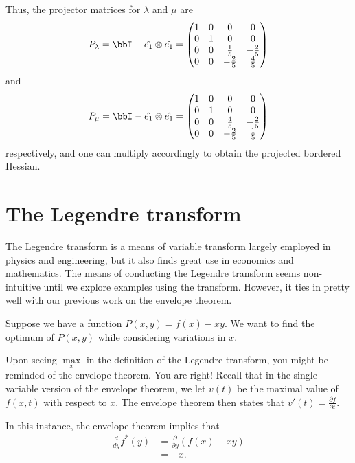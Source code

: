 \documentclass[a4paper, 12pt,oneside,openany]{book}
\begin{document}
{	Thus, the projector matrices for $\lambda$ and $\mu$ are $$P_\lambda = \bbI - \hat{e_1} \otimes \hat{e_1} = \begin{pmatrix} 1 & 0 &0 & 0 \\ 0&1&0&0\\0 &0& \frac{1}{5} & -\frac{2}{5} \\ 0 & 0&-\frac{2}{5} & \frac{4}{5} \end{pmatrix}$$ and $$P_\mu=\bbI - \hat{e_1} \otimes \hat{e_1} = \begin{pmatrix} 1 & 0 &0 & 0 \\ 0&1&0&0\\0 &0& \frac{4}{5} & -\frac{2}{5} \\ 0 & 0&-\frac{2}{5} & \frac{1}{5} \end{pmatrix}$$ respectively, and one can multiply accordingly to obtain the projected bordered Hessian.
}

\section{The Legendre transform}

The Legendre transform is a means of variable transform largely employed in physics and engineering, but it also finds great use in economics and mathematics. The means of conducting the Legendre transform seems non-intuitive until we explore examples using the transform. However, it ties in pretty well with our previous work on the envelope theorem.

Suppose we have a function $P(x, y) = f(x)-xy$. We want to find the optimum of $P(x, y)$ while considering variations in $x$. 


Upon seeing $\max\limits_x$ in the definition of the Legendre transform, you might be reminded of the envelope theorem. You are right! Recall that in the single-variable version of the envelope theorem, we let $v(t)$ be the maximal value of $f(x, t)$ with respect to $x$. The envelope theorem then states that $v'(t) = \frac{\partial f}{\partial t}$. 

In this instance, the envelope theorem implies that \begin{align*}\frac{d}{dy} f^*(y) &= \frac{\partial}{\partial y} (f(x)-xy) \\ &= -x. \end{align*}
\end{document}
